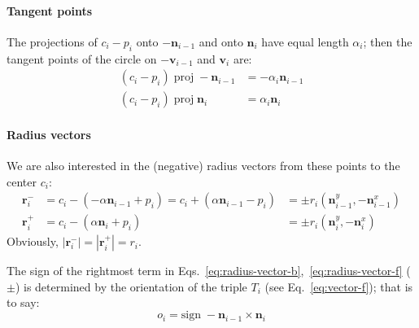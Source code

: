 \documentclass{article}
\begin{document}
\paragraph{Tangent points}
%
The projections of $c_{i}-p_{i}$ onto $-\mathbf{n}_{i-1}$ and onto $\mathbf{n}_{i}$ have equal length $\alpha_i$; then the tangent points of the circle on $-\mathbf{v}_{i-1}$ and $\mathbf{v}_{i}$ are:
%
\begin{align}
  \label{eq:alpha-vector-b}
  \left(c_{i}-p_{i}\right)\;\mathrm{proj}\; -\mathbf{n}_{i-1} &= -\alpha_i\mathbf{n}_{i-1}\\
  \label{eq:alpha-vector-f}
  \left(c_{i}-p_{i}\right)\;\mathrm{proj}\; \mathbf{n}_{i} &= \alpha_i\mathbf{n}_{i}
\end{align}
%
\paragraph{Radius vectors}
%
We are also interested in the (negative) radius vectors from these points to the center $c_{i}$:
%
\begin{align}
  \label{eq:radius-vector-b}
  \mathbf{r}^{-}_{i} &= c_{i} - \left(-\alpha\mathbf{n}_{i-1} + p_{i}\right)=c_{i} + \left(\alpha\mathbf{n}_{i-1} - p_{i}\right)&=\pm r_i\left(\mathbf{n}_{i-1}^{y},  -\mathbf{n}_{i-1}^{x} \right)\\
  \label{eq:radius-vector-f}
  \mathbf{r}^{+}_{i} &= c_{i} - \left(\alpha\mathbf{n}_{i} + p_{i}\right)&=\pm r_i\left(\mathbf{n}_{i}^{y}, -\mathbf{n}_{i}^{x} \right)
\end{align}
%
Obviously, $\left|\mathbf{r}^{-}_{i}\right| = \left|\mathbf{r}^{+}_{i}\right| = r_{i}$.

The sign of the rightmost term in Eqs.~\eqref{eq:radius-vector-b},~\eqref{eq:radius-vector-f} ($\pm$) is determined by the orientation of the triple $T_i$ (see Eq.~\eqref{eq:vector-f}); that is to say:
%
\begin{equation}
  \label{eq:orientation}
  o_i = \mathrm{sign}\; -\mathbf{n}_{i-1} \times \mathbf{n}_{i}
\end{equation}
%
\end{document}
